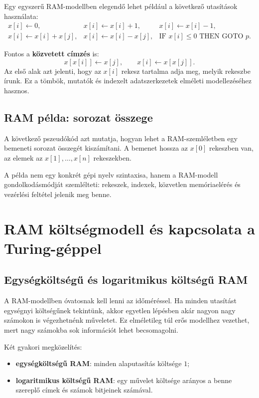 Egy egyszerű RAM-modellben elegendő lehet például a következő utasítások használata:
\[
\begin{array}{lll}
  x[i]\leftarrow 0, & x[i]\leftarrow x[i]+1, & x[i]\leftarrow x[i]-1,\\
  x[i]\leftarrow x[i]+x[j], & x[i]\leftarrow x[i]-x[j], & \text{IF }x[i]\leq 0\text{ THEN GOTO }p.
\end{array}
\]

Fontos a \textbf{közvetett címzés} is:
\[
  x[x[i]]\leftarrow x[j],
  \qquad
  x[i]\leftarrow x[x[j]].
\]
Az első alak azt jelenti, hogy az $x[i]$ rekesz tartalma adja meg, melyik rekeszbe írunk. Ez a tömbök, mutatók és indexelt adatszerkezetek elméleti modellezéséhez hasznos.

\subsection{RAM példa: sorozat összege}

A következő pszeudókód azt mutatja, hogyan lehet a RAM-szemléletben egy bemeneti sorozat összegét kiszámítani. A bemenet hossza az $x[0]$ rekeszben van, az elemek az $x[1],\ldots,x[n]$ rekeszekben.


A példa nem egy konkrét gépi nyelv szintaxisa, hanem a RAM-modell gondolkodásmódját szemlélteti: rekeszek, indexek, közvetlen memóriaelérés és vezérlési feltétel jelenik meg benne.

\section{RAM költségmodell és kapcsolata a Turing-géppel}

\subsection{Egységköltségű és logaritmikus költségű RAM}

A RAM-modellben óvatosnak kell lenni az időméréssel. Ha minden utasítást egységnyi költségűnek tekintünk, akkor egyetlen lépésben akár nagyon nagy számokon is végezhetnénk műveletet. Ez elméletileg túl erős modellhez vezethet, mert nagy számokba sok információt lehet becsomagolni.

Két gyakori megközelítés:

\begin{itemize}
  \item \textbf{egységköltségű RAM}: minden alaputasítás költsége $1$;
  \item \textbf{logaritmikus költségű RAM}: egy művelet költsége arányos a benne szereplő címek és számok bitjeinek számával.
\end{itemize}

